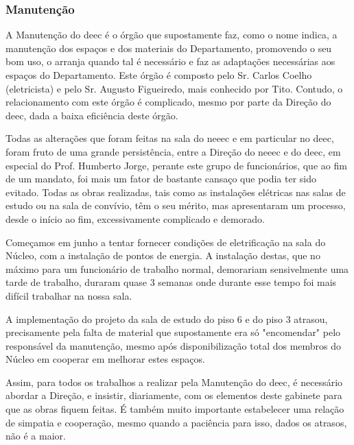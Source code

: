 
\subsubsection{Manutenção}

A Manutenção do \acrshort{deec} é o órgão que supostamente faz, como o nome indica, a manutenção dos espaços e dos materiais do Departamento, promovendo o seu bom uso, o arranja quando tal é necessário e faz as adaptações necessárias aos espaços do Departamento. Este órgão é composto pelo Sr. Carlos Coelho (eletricista) e pelo Sr. Augusto Figueiredo, mais conhecido por Tito. Contudo, o relacionamento com este órgão é complicado, mesmo por parte da Direção do \acrshort{deec}, dada a baixa eficiência deste órgão.

Todas as alterações que foram feitas na sala do \acrshort{neeec} e em particular no \acrshort{deec}, foram fruto de uma grande persistência, entre a Direção do \acrshort{neeec} e do \acrshort{deec}, em especial do Prof. Humberto Jorge, perante este grupo de funcionários, que ao fim de um mandato, foi mais um fator de bastante cansaço que podia ter sido evitado. Todas as obras realizadas, tais como as instalações elétricas nas salas de estudo ou na sala de convívio, têm o seu mérito, mas apresentaram um processo, desde o início ao fim, excessivamente complicado e demorado.

Começamos em junho a tentar fornecer condições de eletrificação na sala do Núcleo, com a instalação de pontos de energia. A instalação destas, que no máximo para um funcionário de trabalho normal, demorariam sensivelmente uma tarde de trabalho, duraram quase 3 semanas onde durante esse tempo foi mais difícil trabalhar na nossa sala.

A implementação do projeto da sala de estudo do piso 6 e do piso 3 atrasou, precisamente pela falta de material que supostamente era só "encomendar" pelo responsável da manutenção, mesmo após disponibilização total dos membros do Núcleo em cooperar em melhorar estes espaços.

Assim, para todos os trabalhos a realizar pela Manutenção do \acrshort{deec}, é necessário abordar a Direção, e insistir, diariamente, com os elementos deste gabinete para que as obras fiquem feitas. É também muito importante estabelecer uma relação de simpatia e cooperação, mesmo quando a paciência para isso, dados os atrasos, não é a maior.
